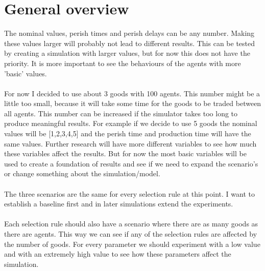 \documentclass{article}
\begin{document}
\section{General overview}
The nominal values, perish times and perish delays can be any number. Making these values larger will probably not lead to different results. This can be tested by creating a simulation with larger values, but for now this does not have the priority. It is more important to see the behaviours of the agents with more 'basic' values.
\\
\\
For now I decided to use about 3 goods with 100 agents. This number might be a little too small, because it will take some time for the goods to be traded between all agents. This number can be increased if the simulator takes too long to produce meaningful results. For example if we decide to use 5 goods the nominal values will be [1,2,3,4,5] and the perish time and production time will have the same values. Further research will have more different variables to see how much these variables affect the results. But for now the most basic variables will be used to create a foundation of results and see if we need to expand the scenario’s or change something about the simulation/model.
\\
\\
The three scenarios are the same for every selection rule at this point. I want to establish a baseline first and in later simulations extend the experiments. 
\\
\\
Each selection rule should also have a scenario where there are as many goods as there are agents. This way we can see if any of the selection rules are affected by the number of goods. For every parameter we should experiment with a low value and with an extremely high value to see how these parameters affect the simulation.



\end{document}
